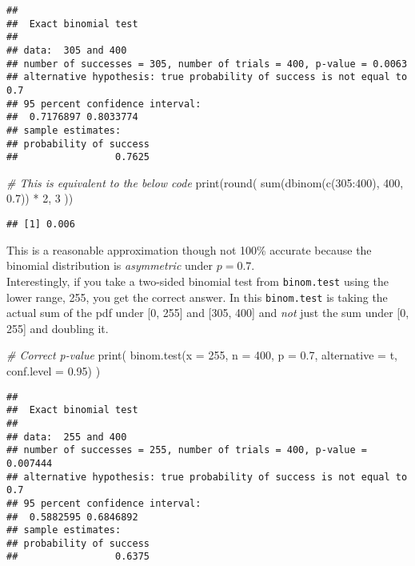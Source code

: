 \documentclass[
]{article}
\newenvironment{Shaded}{\begin{snugshade}}{\end{snugshade}}
\newcommand{\AttributeTok}[1]{\textcolor[rgb]{0.77,0.63,0.00}{#1}}
\newcommand{\CommentTok}[1]{\textcolor[rgb]{0.56,0.35,0.01}{\textit{#1}}}
\newcommand{\DecValTok}[1]{\textcolor[rgb]{0.00,0.00,0.81}{#1}}
\newcommand{\FloatTok}[1]{\textcolor[rgb]{0.00,0.00,0.81}{#1}}
\newcommand{\FunctionTok}[1]{\textcolor[rgb]{0.00,0.00,0.00}{#1}}
\newcommand{\NormalTok}[1]{#1}
\newcommand{\SpecialCharTok}[1]{\textcolor[rgb]{0.00,0.00,0.00}{#1}}
\newcommand{\StringTok}[1]{\textcolor[rgb]{0.31,0.60,0.02}{#1}}
\begin{document}
\begin{verbatim}
## 
##  Exact binomial test
## 
## data:  305 and 400
## number of successes = 305, number of trials = 400, p-value = 0.0063
## alternative hypothesis: true probability of success is not equal to 0.7
## 95 percent confidence interval:
##  0.7176897 0.8033774
## sample estimates:
## probability of success 
##                 0.7625
\end{verbatim}

\begin{Shaded}
\begin{Highlighting}[]
\CommentTok{\# This is equivalent to the below code}
\FunctionTok{print}\NormalTok{(}\FunctionTok{round}\NormalTok{(}
  \FunctionTok{sum}\NormalTok{(}\FunctionTok{dbinom}\NormalTok{(}\FunctionTok{c}\NormalTok{(}\DecValTok{305}\SpecialCharTok{:}\DecValTok{400}\NormalTok{), }\DecValTok{400}\NormalTok{, }\FloatTok{0.7}\NormalTok{)) }\SpecialCharTok{*} \DecValTok{2}\NormalTok{, }\DecValTok{3}
\NormalTok{))}
\end{Highlighting}
\end{Shaded}

\begin{verbatim}
## [1] 0.006
\end{verbatim}

This is a reasonable approximation though not 100\% accurate because the
binomial distribution is \emph{asymmetric} under \(p=0.7\).\\
Interestingly, if you take a two-sided binomial test from
\texttt{binom.test} using the lower range, 255, you get the correct
answer. In this \texttt{binom.test} is taking the actual sum of the pdf
under {[}0, 255{]} and {[}305, 400{]} and \emph{not} just the sum under
{[}0, 255{]} and doubling it.

\begin{Shaded}
\begin{Highlighting}[]
\CommentTok{\# Correct p{-}value}
\FunctionTok{print}\NormalTok{(}
  \FunctionTok{binom.test}\NormalTok{(}\AttributeTok{x =} \DecValTok{255}\NormalTok{, }\AttributeTok{n =} \DecValTok{400}\NormalTok{, }\AttributeTok{p =} \FloatTok{0.7}\NormalTok{, }\AttributeTok{alternative =} \StringTok{\textquotesingle{}t\textquotesingle{}}\NormalTok{, }\AttributeTok{conf.level =} \FloatTok{0.95}\NormalTok{)}
\NormalTok{)}
\end{Highlighting}
\end{Shaded}

\begin{verbatim}
## 
##  Exact binomial test
## 
## data:  255 and 400
## number of successes = 255, number of trials = 400, p-value = 0.007444
## alternative hypothesis: true probability of success is not equal to 0.7
## 95 percent confidence interval:
##  0.5882595 0.6846892
## sample estimates:
## probability of success 
##                 0.6375
\end{verbatim}
\end{document}
